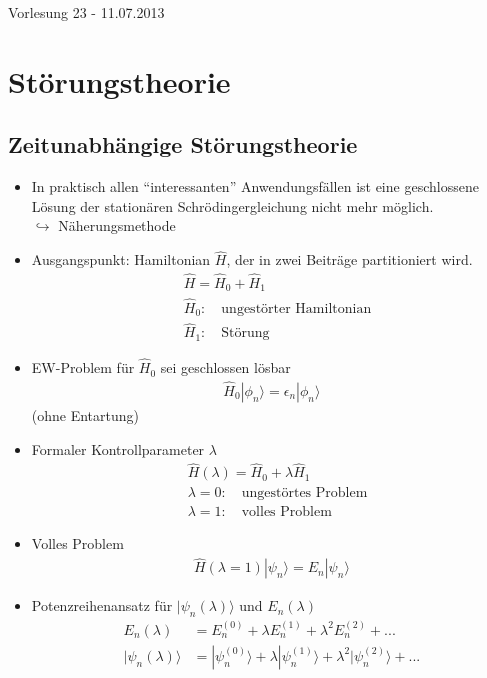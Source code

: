 \documentclass[10pt,article,colorback,accentcolor=tud9d]{scrartcl}
\begin{document}
\begin{flushright}
Vorlesung 23 - 11.07.2013
\end{flushright}

\section{Störungstheorie}
\subsection{Zeitunabhängige Störungstheorie}
\begin{itemize}
	\item In praktisch allen "`interessanten"' Anwendungsfällen ist eine geschlossene Lösung der stationären Schrödingergleichung nicht mehr möglich.\\
    $\hookrightarrow$ Näherungsmethode
  \item Ausgangspunkt: Hamiltonian $\hat{H}$, der in zwei Beiträge partitioniert wird.
    \begin{align}
    &\hat{H}=\hat{H}_0+\hat{H}_1\\
    &\hat{H}_0:\quad\text{ungestörter Hamiltonian}\\
    &\hat{H}_1:\quad\text{Störung}
    \end{align}
  \item EW-Problem für $\hat{H}_0$ sei geschlossen lösbar
    \begin{align}
    \hat{H}_0|\phi_n\rangle=\epsilon_n|\phi_n\rangle
    \end{align}
    (ohne Entartung)
  \item Formaler Kontrollparameter $\lambda$
    \begin{align}
    &\hat{H}(\lambda)=\hat{H}_0+\lambda\hat{H}_1\\
    &\lambda=0:\quad\text{ungestörtes Problem}\\
    &\lambda=1:\quad\text{volles Problem}
    \end{align}
  \item Volles Problem
    \begin{align}
    \hat{H}(\lambda=1)|\psi_n\rangle=E_n|\psi_n\rangle
    \end{align}
  \item Potenzreihenansatz für $|\psi_n(\lambda)\rangle$ und $E_n(\lambda)$
    \begin{align}
    E_n(\lambda)&=E_n^{(0)}+\lambda E_n^{(1)}+\lambda^2 E_n^{(2)}+...\\
    |\psi_n(\lambda)\rangle&=|\psi_n^{(0)}\rangle+\lambda|\psi_n^{(1)}\rangle+\lambda^2|\psi_n^{(2)}\rangle+...

\end{align}
\end{itemize}
\end{document}

